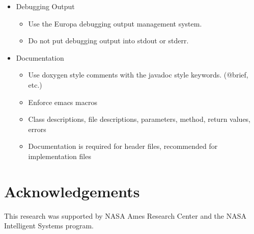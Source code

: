 \documentclass[10pt, letterpaper, twoside]{article}
\begin{document}
\begin{itemize}
\item[] Debugging Output
 \begin{itemize}
  \item	Use the Europa debugging output management system.
  \item	Do not put debugging output into stdout or stderr.
 \end{itemize}

\item[] Documentation
 \begin{itemize}
  \item	Use doxygen style comments with the javadoc style keywords. (@brief, etc.)
  \item	Enforce emacs macros
  \item	Class descriptions, file descriptions, parameters, method, return values, errors  
  \item	Documentation is required for header files, recommended for implementation files
 \end{itemize}
\end{itemize}

\section{Acknowledgements}
\label{ack}
This research was supported by NASA Ames Research Center and the NASA
Intelligent Systems program. 


\end{document}
